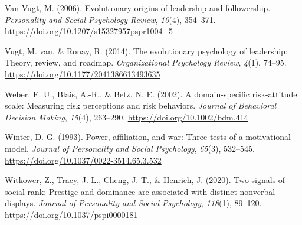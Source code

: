\documentclass[
  donotrepeattitle,doc, 12pt, a4paper,floatsintext]{apa7}
\newlength{\cslhangindent}
\newlength{\cslentryspacingunit} %
\newenvironment{CSLReferences}[2] %
 {%
  \setlength{\parindent}{0pt}
  \ifodd #1
  \let\oldpar\par
  \def\par{\hangindent=\cslhangindent\oldpar}
  \fi
  \setlength{\parskip}{#2\cslentryspacingunit}
 }%
 {}
\begin{document}
\begin{CSLReferences}{1}{0}
\leavevmode{}%
Van Vugt, M. (2006). Evolutionary origins of leadership and followership. \emph{Personality and Social Psychology Review}, \emph{10}(4), 354--371. \url{https://doi.org/10.1207/s15327957pspr1004_5}

\leavevmode{}%
Vugt, M. van, \& Ronay, R. (2014). The evolutionary psychology of leadership: Theory, review, and roadmap. \emph{Organizational Psychology Review}, \emph{4}(1), 74--95. \url{https://doi.org/10.1177/2041386613493635}

\leavevmode{}%
Weber, E. U., Blais, A.-R., \& Betz, N. E. (2002). A domain-specific risk-attitude scale: Measuring risk perceptions and risk behaviors. \emph{Journal of Behavioral Decision Making}, \emph{15}(4), 263--290. \url{https://doi.org/10.1002/bdm.414}

\leavevmode{}%
Winter, D. G. (1993). Power, affiliation, and war: Three tests of a motivational model. \emph{Journal of Personality and Social Psychology}, \emph{65}(3), 532--545. \url{https://doi.org/10.1037/0022-3514.65.3.532}

\leavevmode{}%
Witkower, Z., Tracy, J. L., Cheng, J. T., \& Henrich, J. (2020). Two signals of social rank: Prestige and dominance are associated with distinct nonverbal displays. \emph{Journal of Personality and Social Psychology}, \emph{118}(1), 89--120. \url{https://doi.org/10.1037/pspi0000181}

\end{CSLReferences}

\endgroup

\newpage
\end{document}
